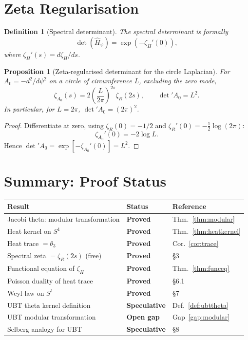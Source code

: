\documentclass[11pt,a4paper]{article}
\newtheorem{proposition}{Proposition}
\newtheorem{definition}{Definition}
\begin{document}
\section{Zeta Regularisation}

\begin{definition}[Spectral determinant]
  The spectral determinant is formally
  \[
    \det(\hat{H}_\psi) = \exp\!\left(-\zeta_H'(0)\right),
  \]
  where $\zeta_H'(s) = d\zeta_H/ds$.
\end{definition}

\begin{proposition}[Zeta-regularised determinant for the circle Laplacian]
For $A_0=-d^2/d\psi^2$ on a circle of circumference $L$, excluding the zero mode,
\[
 \zeta_{A_0}(s)=2\left(\frac{L}{2\pi}\right)^{2s}\zeta_R(2s),
 \qquad
 \boxed{\det{}' A_0=L^2}.
\]
In particular, for $L=2\pi$, $\det{}'A_0=(2\pi)^2$.
\end{proposition}

\begin{proof}
Differentiate at zero, using $\zeta_R(0)=-1/2$ and
$\zeta_R'(0)=-\tfrac12\log(2\pi)$:
\[
 \zeta_{A_0}'(0)=-2\log L.
\]
Hence $\det{}'A_0=\exp[-\zeta_{A_0}'(0)]=L^2$.
\end{proof}

\section{Summary: Proof Status}

\begin{center}
\begin{tabular}{lll}
\hline
Result & Status & Reference \\
\hline
Jacobi theta: modular transformation & \textbf{Proved} & Thm.~\ref{thm:modular} \\
Heat kernel on $S^1$ & \textbf{Proved} & Thm.~\ref{thm:heatkernel} \\
Heat trace $= \theta_3$ & \textbf{Proved} & Cor.~\ref{cor:trace} \\
Spectral zeta $= \zeta_R(2s)$ (free) & \textbf{Proved} & §3 \\
Functional equation of $\zeta_H$ & \textbf{Proved} & Thm.~\ref{thm:funceq} \\
Poisson duality of heat trace & \textbf{Proved} & §6.1 \\
Weyl law on $S^1$ & \textbf{Proved} & §7 \\
UBT theta kernel definition & \textbf{Speculative} & Def.~\ref{def:ubttheta} \\
UBT modular transformation & \textbf{Open gap} & Gap~\ref{gap:modular} \\
Selberg analogy for UBT & \textbf{Speculative} & §8 \\
\hline
\end{tabular}
\end{center}
\end{document}
